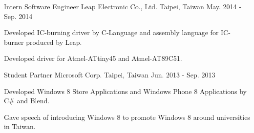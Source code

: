 \begin{cventries}
    \cventry
        {Intern Software Engineer}
        {Leap Electronic Co., Ltd.}
        {Taipei, Taiwan}
        {May. 2014 - Sep. 2014}
        {
            \begin{cvitems}
                \item
                    {
                        Developed IC-burning driver by C-Language and assembly language for IC-burner produced by Leap.
                    }
                \item
                    {
                        Developed driver for Atmel-ATtiny45 and Atmel-AT89C51.
                    }
            \end{cvitems}
        }
        
    
    \cventry
        {Student Partner}
        {Microsoft Corp.}
        {Taipei, Taiwan}
        {Jun. 2013 - Sep. 2013}
        {
            \begin{cvitems}
                \item Developed Windows 8 Store Applications and Windows Phone 8 Applications by C\# and Blend.
                \item Gave speech of introducing Windows 8 to promote Windows 8 around universities in Taiwan.
            \end{cvitems}
        }

\end{cventries}
